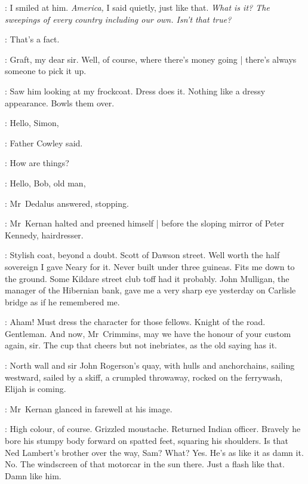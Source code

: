 :
I smiled at him.
\emph{America,}
I said quietly,
just like that.
\emph{What is it?
The sweepings of every country including our own.
Isn't that true?}

\crimmins:
That's a fact.

:
Graft,
my dear sir.
Well, of course, where there's money going |
there's always someone to pick it up.

:
Saw him looking at my frockcoat.
Dress does it.
Nothing like a dressy appearance.
Bowls them over.

\begin{interject}
    \cowley:
    Hello, Simon,

    :
    Father Cowley said.

    \cowley:
    How are things?

    \simon:
    Hello, Bob, old man,

    :
    Mr~Dedalus answered,
    stopping.
\end{interject}

:
Mr~Kernan halted and preened himself |
before the sloping mirror of Peter Kennedy, hairdresser.

:
Stylish coat, beyond a doubt.
Scott of Dawson street.
Well worth the half sovereign I gave Neary for it.
Never built under three guineas.
Fits me down to the ground.
Some Kildare street club toff had it probably.
John Mulligan, the manager of the Hibernian bank,
gave me a very sharp eye yesterday
on Carlisle bridge as if he remembered me.

:
Aham!
Must dress the character for those fellows.
Knight of the road.
Gentleman.
And now, Mr~Crimmins,
may we have the honour of your custom again, sir.%
The cup that cheers but not inebriates,
as the old saying has it.

\begin{interject}
    :
    North wall and sir John Rogerson's quay,
    with hulls and anchorchains,
    sailing westward,
    sailed by a skiff,
    a crumpled throwaway,
    rocked on the ferrywash,
    Elijah is coming.
\end{interject}

:
Mr~Kernan glanced in farewell at his image.

:
High colour, of course.
Grizzled moustache.
Returned Indian officer.
Bravely he bore his stumpy body forward on spatted feet,
squaring his shoulders.
Is that Ned Lambert's brother over the way, Sam?
What?
Yes.
He's as like it as damn it.
No.
The windscreen of that motorcar in the sun there.
Just a flash like that.
Damn like him.%

